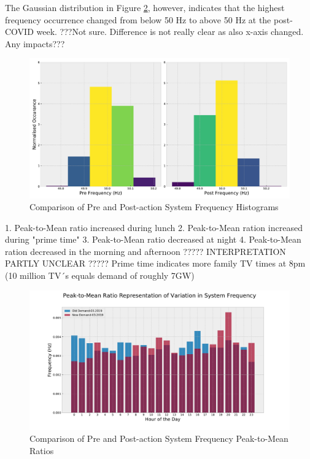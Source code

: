 \documentclass[energies,article,submit,moreauthors,pdftex]{Definitions/mdpi}
\begin{document}
The Gaussian distribution in Figure \ref{fig:freq_hist}, however, indicates that the highest frequency occurrence changed from below 50 Hz to above 50 Hz at the post-COVID week. ???Not sure. Difference is not really clear as also x-axis changed. Any impacts???

\begin{figure}[H]
\centering

\hspace{-25pt}\includegraphics[width=16.5 cm]{Graphics/Freq_hist_side_by_side.pdf}
\caption{Comparison of Pre and Post-action System Frequency Histograms} \label{fig:freq_hist}
\end{figure}  

1. Peak-to-Mean ratio increased during lunch
2. Peak-to-Mean ration increased during "prime time"
3. Peak-to-Mean ratio decreased at night
4. Peak-to-Mean ration decreased in the morning and afternoon
????? INTERPRETATION PARTLY UNCLEAR ????? Prime time indicates more family TV times at 8pm (10 million TV´s equals demand of roughly 7GW)


\begin{figure}[H]
\centering
\hspace{-25pt}\includegraphics[width=14 cm]{Graphics/Freq_PtM.pdf}
\caption{Comparison of Pre and Post-action System Frequency Peak-to-Mean Ratios} \label{fig:freq_hist}
\end{figure}  
\end{document}
